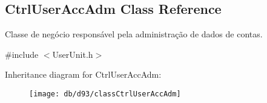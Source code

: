 \hypertarget{classCtrlUserAccAdm}{\subsection{Ctrl\-User\-Acc\-Adm Class Reference}
\label{db/d93/classCtrlUserAccAdm}
}


Classe de negócio responsável pela administração de dados de contas.  




{\ttfamily \#include $<$User\-Unit.\-h$>$}

Inheritance diagram for Ctrl\-User\-Acc\-Adm\-:\begin{figure}[H]
\begin{center}
\leavevmode
\texttt{[image: db/d93/classCtrlUserAccAdm]}
\end{center}
\end{figure}
